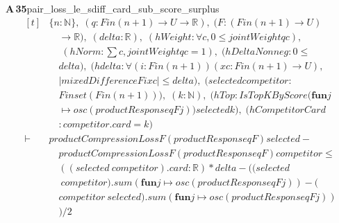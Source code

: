 \documentclass[conference]{IEEEtran}
\theoremstyle{definition}
\newcommand{\lean}[1]{\textsf{\footnotesize #1}}
\begin{document}
\noindent\textbf{A\,35}\quad\lean{pair\_loss\_le\_sdiff\_card\_sub\_score\_surplus}
{\footnotesize\[ \begin{aligned}[t]
&\{ \mathit{n} : \mathbb{N} \},\; (\mathit{q} : \mathit{Fin} (\mathit{n} + 1) \to \mathit{U} \to \mathbb{R} ),\; (\mathit{F} : (\mathit{Fin} (\mathit{n} + 1) \to \mathit{U})\\
&\quad \to \mathbb{R} ),\; (\mathit{delta} : \mathbb{R} ),\; (\mathit{hWeight} : \forall \mathit{c}, 0 \leq \mathit{jointWeight} \mathit{q} \mathit{c}),\\
&\quad \; (\mathit{hNorm} : \textstyle\sum \mathit{c}, \mathit{jointWeight} \mathit{q} \mathit{c} = 1),\; (\mathit{hDeltaNonneg} : 0 \leq\\
&\quad \mathit{delta}),\; (\mathit{hdelta} : \forall (\mathit{i} : \mathit{Fin} (\mathit{n} + 1)) (\mathit{x} \mathit{c} : \mathit{Fin} (\mathit{n} + 1) \to \mathit{U}),\\
&\quad |\mathit{mixedDifference} \mathit{F} \mathit{i} \mathit{x} \mathit{c}| \leq \mathit{delta}),\; (\mathit{selected} \mathit{competitor} :\\
&\quad \mathit{Finset} (\mathit{Fin} (\mathit{n} + 1))),\; (\mathit{k} : \mathbb{N} ),\; (\mathit{hTop} : \mathit{IsTopKByScore} (\mathbf{fun} \mathit{j}\\
&\quad \mapsto \mathit{osc} (\mathit{productResponse} \mathit{q} \mathit{F} \mathit{j})) \mathit{selected} \mathit{k}),\; (\mathit{hCompetitorCard}\\
&\quad : \mathit{competitor}.\mathit{card} = \mathit{k})\\
\vdash\;&\mathit{productCompressionLoss} \mathit{F} (\mathit{productResponse} \mathit{q} \mathit{F}) \mathit{selected} -\\
&\quad \mathit{productCompressionLoss} \mathit{F} (\mathit{productResponse} \mathit{q} \mathit{F}) \mathit{competitor} \leq\\
&\quad ((\mathit{selected} \ \mathit{competitor}).\mathit{card} : \mathbb{R} ) * \mathit{delta} - ((\mathit{selected}\\
&\quad \ \mathit{competitor}).\mathit{sum} (\mathbf{fun} \mathit{j} \mapsto \mathit{osc} (\mathit{productResponse} \mathit{q} \mathit{F} \mathit{j})) - (\\
&\quad \mathit{competitor} \ \mathit{selected}).\mathit{sum} (\mathbf{fun} \mathit{j} \mapsto \mathit{osc} (\mathit{productResponse} \mathit{q} \mathit{F} \mathit{j}))\\
&\quad ) / 2
\end{aligned} \]}
\end{document}
